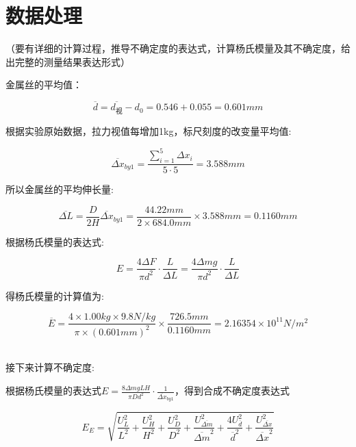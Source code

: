 \documentclass{ctexart}
\begin{document}

\newpage

\section{数据处理}

（要有详细的计算过程，推导不确定度的表达式，计算杨氏模量及其不确定度，给出完整的测量结果表达形式）

金属丝的平均值：

$$ \overline{d} = \overline{d_视} - d_0 =  0.546 + 0.055 = 0.601 mm $$

根据实验原始数据，拉力视值每增加1kg，标尺刻度的改变量平均值:

$$ \overline{\Delta x}_{by1} = \frac{\sum_{i=1}^{5}\Delta x_i}{5 \cdot 5} = 3.588 mm $$

所以金属丝的平均伸长量:

$$ \overline{\Delta L} = \frac{D}{2H} \overline{\Delta x}_{by1} = \frac{44.22 mm}{2 \times 684.0 mm}\times 3.588 mm = 0.1160 mm $$

根据杨氏模量的表达式:

$$ E = \frac{4 \Delta F}{\pi d^2} \cdot \frac{L}{\Delta L} = \frac{4\Delta m g}{\pi d^2} \cdot \frac{L}{\Delta L}$$

得杨氏模量的计算值为:

$$ \overline{E} = \frac{4\times 1.00 kg \times 9.8 N/kg}{\pi \times (0.601 mm)^2} \times \frac{726.5 mm}{0.1160 mm} = 2.16354 \times 10^{11} N/m^2 $$


~\\
接下来计算不确定度:

根据杨氏模量的表达式$E = \frac{8\Delta mgLH}{\pi Dd^2}\cdot\frac{1}{\overline{\Delta x}_{by1}}$，得到合成不确定度表达式

$$ E_E = \sqrt{\frac{U_L^2}{L^2}+\frac{U_H^2}{H^2}+\frac{U_D^2}{D^2}+\frac{U_{\overline{\Delta m}}^2}{{\overline{\Delta m}}^2}+\frac{4 U_{\overline{d}}^2}{{\overline{d}}^2}+\frac{U_{\overline{\Delta x}}^2}{\overline{\Delta x}^2}} $$
\end{document}
